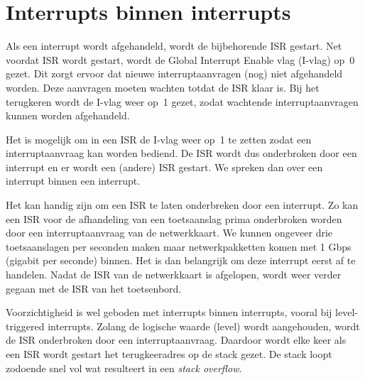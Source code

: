 \section{Interrupts binnen interrupts}
Als een interrupt wordt afgehandeld, wordt de bijbehorende ISR gestart. Net
voordat ISR wordt gestart, wordt de Global Interrupt Enable vlag (I-vlag)
op~0 gezet. Dit zorgt ervoor dat nieuwe interruptaanvragen (nog) niet
afgehandeld worden. Deze aanvragen moeten wachten totdat de ISR klaar is.
Bij het terugkeren wordt de I-vlag weer op~1 gezet, zodat wachtende
interruptaanvragen kunnen worden afgehandeld.

Het is mogelijk om in een ISR de I-vlag weer op~1 te zetten zodat een
interruptaanvraag kan worden bediend. De ISR wordt dus onderbroken door
een interrupt en er wordt een (andere) ISR gestart. We spreken dan over
een interrupt binnen een interrupt.

Het kan handig zijn om een ISR te laten onderbreken door een interrupt.
Zo kan een ISR voor de afhandeling van een toetsaanslag prima onderbroken
worden door een interruptaanvraag van de netwerkkaart. We kunnen ongeveer
drie toetsaanslagen per seconden maken maar netwerkpakketten komen met
1 Gbps (gigabit per seconde) binnen. Het is dan belangrijk om deze
interrupt eerst af te handelen. Nadat de ISR van de netwerkkaart is
afgelopen, wordt weer verder gegaan met de ISR van het toetsenbord.

Voorzichtigheid is wel geboden met interrupts binnen interrupts, vooral
bij level-triggered interrupts. Zolang de logische waarde (level) wordt
aangehouden, wordt de ISR onderbroken door een interruptaanvraag. Daardoor
wordt elke keer als een ISR wordt gestart het terugkeeradres op de stack
gezet. De stack loopt zodoende snel vol wat resulteert in een \textsl{stack
overflow}.